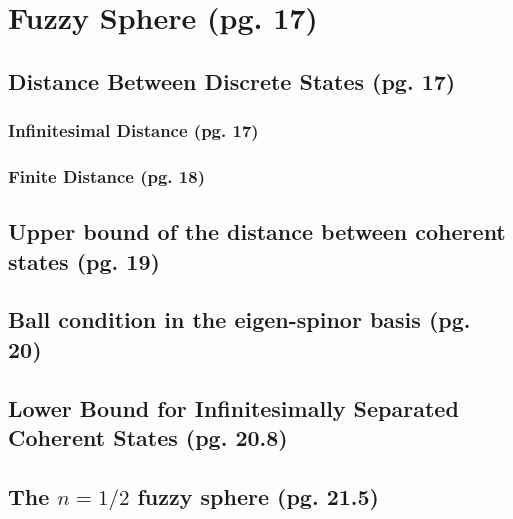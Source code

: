\documentclass{article}
\begin{document}
\section{Fuzzy Sphere (pg. 17)}

\subsection{Distance Between Discrete States (pg. 17)}

\subsubsection{Infinitesimal Distance (pg. 17)}%

\subsubsection{Finite Distance (pg. 18)}%

\subsection{Upper bound of the distance between coherent states (pg. 19)}


\subsection{Ball condition in the eigen-spinor basis (pg. 20)}

\subsection{Lower Bound for Infinitesimally Separated Coherent States (pg. 20.8)}

\subsection{The $n=1/2$ fuzzy sphere (pg. 21.5)}
\end{document}
